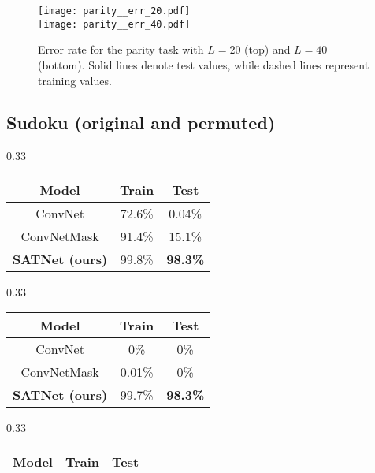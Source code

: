 \documentclass{article}
\begin{document}
	\begin{figure}
		\centering
		\texttt{[image: parity\_\_err\_20.pdf]} \\
		\texttt{[image: parity\_\_err\_40.pdf]}
		\caption{Error rate for the parity task with $L = 20$ (top) and $L = 40$ (bottom). Solid lines denote test values, while dashed lines represent training values.} 
		\label{fig:parity}
	\end{figure}
	
	\subsection{Sudoku (original and permuted)}
	\label{sec:sudoku}
	
	\begingroup
    \renewcommand*{\arraystretch}{1.2}
	\begin{table*}[t!]
	    \centering
	    \begin{subtable}[t]{0.33\textwidth}
        \centering
	    \begin{tabular}{ccc}
	    \toprule
	       \textbf{Model}  &  \textbf{Train} &  \textbf{Test} \\
	   \midrule
	       ConvNet & 72.6\% & 0.04\% \\
ConvNetMask & 91.4\% & 15.1\% \\
\textbf{SATNet (ours)}  & 99.8\% & \textbf{98.3\%}    \\
	   \bottomrule
	    \end{tabular}
	    \caption{Original Sudoku.}
	    \end{subtable}\begin{subtable}[t]{0.33\textwidth}
        \centering
	    \begin{tabular}{ccc}
	    \toprule
	       \textbf{Model}  &  \textbf{Train} &  \textbf{Test} \\
	   \midrule
	       ConvNet & 0\% & 0\% \\
ConvNetMask & 0.01\% & 0\% \\
\textbf{SATNet (ours)}  & 99.7\% &  \textbf{98.3\%}   \\
	   \bottomrule
	    \end{tabular}
	    \caption{Permuted Sudoku.}
	    \end{subtable}
	    \begin{subtable}[t]{0.33\textwidth}
        \centering
	    \begin{tabular}{ccc}
	    \toprule
	       \textbf{Model}  &  \textbf{Train} &  \textbf{Test} \\
	   \midrule

\end{tabular}
\end{subtable}
\end{table*}
\end{document}
